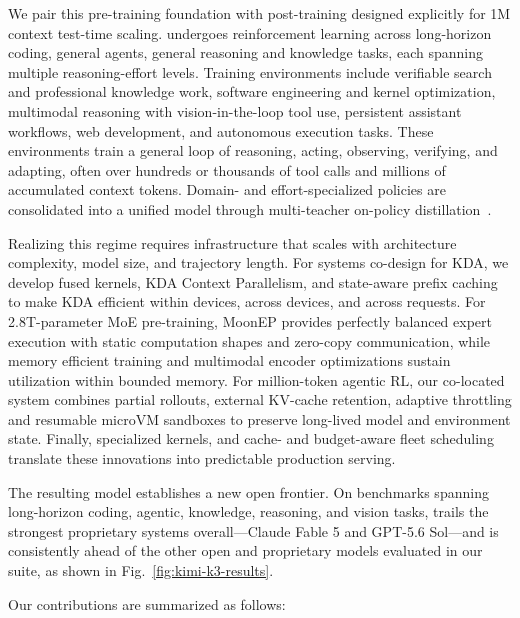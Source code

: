 We pair this pre-training foundation with post-training designed explicitly for 1M context test-time scaling.
 undergoes reinforcement learning across long-horizon coding, general agents, general reasoning and knowledge tasks, each spanning multiple reasoning-effort levels.
Training environments include verifiable search and professional knowledge work, software engineering and kernel optimization, multimodal reasoning with vision-in-the-loop tool use, persistent assistant workflows, web development, and autonomous execution tasks.
These environments train a general loop of reasoning, acting, observing, verifying, and adapting, often over hundreds or thousands of tool calls and millions of accumulated context tokens.
Domain- and effort-specialized policies are consolidated into a unified model through multi-teacher on-policy distillation~\citep{lu2025onpolicydistillation, xiao2026mimov2flash, deepseekv4}.


Realizing this regime requires infrastructure that scales with architecture complexity, model size, and trajectory length. 
For systems co-design for KDA, we develop fused kernels, KDA Context Parallelism, and state-aware prefix caching to make KDA efficient within devices, across devices, and across requests. 
For 2.8T-parameter MoE pre-training, MoonEP provides perfectly balanced expert execution with static computation shapes and zero-copy communication, while memory efficient training and multimodal encoder optimizations sustain utilization within bounded memory. 
For million-token agentic RL, our co-located system combines partial rollouts, external KV-cache retention, adaptive throttling and resumable microVM sandboxes to preserve long-lived model and environment state. 
Finally, specialized kernels, and cache- and budget-aware fleet scheduling translate these innovations into predictable production serving.


The resulting model establishes a new open frontier.
On benchmarks spanning long-horizon
coding, agentic, knowledge, reasoning, and vision tasks,  trails the strongest proprietary systems overall---Claude Fable 5 and GPT-5.6 Sol---and is consistently ahead of the other open and proprietary models evaluated in our suite, as shown in Fig.~\ref{fig:kimi-k3-results}.

Our contributions are summarized as follows:

